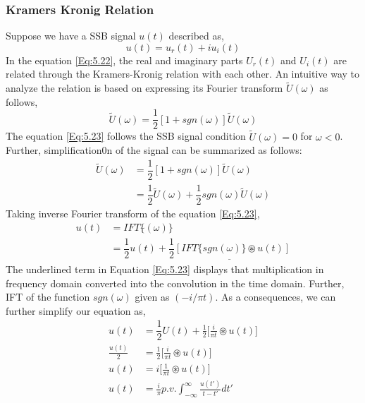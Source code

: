  
\subsubsection{Kramers Kronig Relation}
Suppose we have a SSB signal $u(t)$ described as,
\begin{equation}
u(t)=u_r(t)+iu_i(t)
\label{Eq:5.22}
\end{equation}
In the equation \ref{Eq:5.22}, the real and imaginary parts $U_r(t)$ and $U_i(t)$ are related through the Kramers-Kronig relation with each other. An intuitive way to analyze the relation is based on expressing its Fourier transform $\tilde{U}(\omega)$ as follows,
\begin{equation}
\tilde{U}(\omega)=\dfrac{1}{2}[1+sgn(\omega)]\tilde{U}(\omega)
\label{Eq:5.23}
\end{equation}
The equation \ref{Eq:5.23} follows the SSB signal condition $\tilde{U}(\omega)=0$ for $\omega<0$. Further, simplification0n of the signal can be summarized as follows:
\begin{equation}
\begin{split}
\tilde{U}(\omega)&=\dfrac{1}{2}[1+sgn(\omega)]\tilde{U}(\omega)\\
				 &=\dfrac{1}{2}\tilde{U}(\omega)+\dfrac{1}{2}sgn(\omega)\tilde{U}(\omega)
\end{split}
\label{Eq:5.23}
\end{equation}
Taking inverse Fourier transform of the equation \ref{Eq:5.23},
\begin{equation}
\begin{split}
	{u}(t)&=IFT\{\tilde{}(\omega)\}\\
	      &=\dfrac{1}{2}{u}(t)+\underline{\dfrac{1}{2}[IFT\{sgn(\omega)\} \circledast {u}(t)]}
\end{split}
\label{Eq:5.23}
\end{equation}
The underlined term in Equation \ref{Eq:5.23} displays that multiplication in frequency domain converted into the convolution in the time domain. Further, IFT of the function $sgn(\omega)$ given as $(-i/\pi t)$. As a consequences, we can further simplify our equation as,
\begin{equation}
\begin{split}
{u}(t)&=\dfrac{1}{2}{U}(t)+\frac{1}{2}\bigg[\frac{i}{\pi t} \circledast {u}(t) \bigg]\\
\frac{{u}(t)}{2} &=\frac{1}{2}\bigg[\frac{i}{\pi t} \circledast {u}(t) \bigg]\\
{u}(t) &=i\bigg[\frac{1}{\pi t} \circledast {u}(t) \bigg]\\
{u}(t) &=\frac{i}{\pi} p.v. \int_{-\infty}^{\infty} \frac{u(t')}{t-t'} dt' 
\end{split}
\label{Eq:5.24}
\end{equation}
